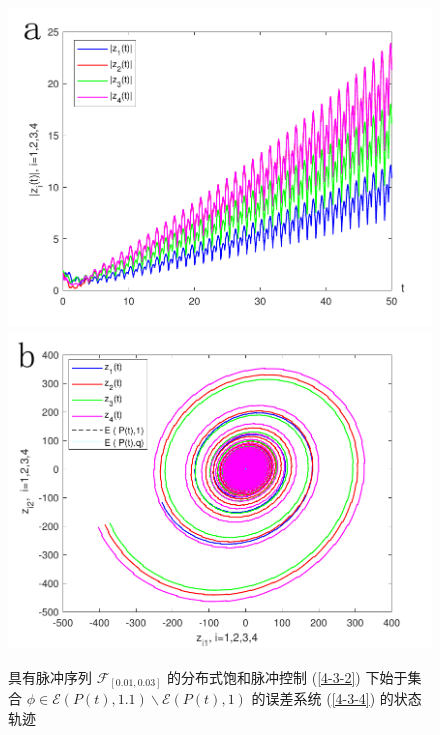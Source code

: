 \begin{figure}[H]
    \centering
    \includegraphics[scale=0.5  ]{./ch4/fig4-11-1.pdf}
    \includegraphics[scale=0.5 ]{./ch4/fig4-11-2.pdf} 
    \caption{具有脉冲序列 $\mathscr{F}_{[0.01,0.03]}$ 的分布式饱和脉冲控制 (\ref{4-3-2}) 下始于集合 $\phi\in \mathscr{E}( P(t),1.1) \backslash\mathscr{E}( P(t),1)$ 的误差系统 (\ref{4-3-4}) 的状态轨迹 }
    \label{f4-11}
\end{figure}  
